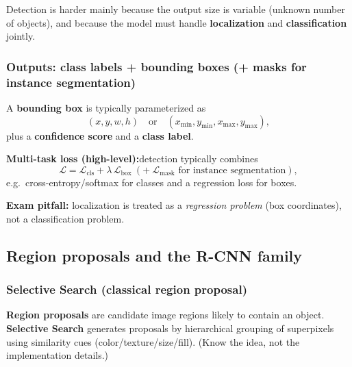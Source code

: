 \documentclass[11pt,a4paper]{article}
\begin{document}
\begin{notebox}
Detection is harder mainly because the output size is variable (unknown number of objects), and because the model must
handle \textbf{localization} and \textbf{classification} jointly.
\end{notebox}

\subsubsection{Outputs: class labels + bounding boxes (+ masks for instance segmentation)}

\begin{defbox}
A \textbf{bounding box} is typically parameterized as
\[
(x, y, w, h) \quad \text{or} \quad (x_{\min}, y_{\min}, x_{\max}, y_{\max}),
\]
plus a \textbf{confidence score} and a \textbf{class label}.
\end{defbox}

\begin{mathrule}
\textbf{Multi-task loss (high-level):}\quad detection typically combines
\[
\mathcal{L} = \mathcal{L}_{\text{cls}} + \lambda\,\mathcal{L}_{\text{box}} \ (+\ \mathcal{L}_{\text{mask}} \text{ for instance segmentation}),
\]
e.g.\ cross-entropy/softmax for classes and a regression loss for boxes.
\end{mathrule}

\begin{qbox}
\textbf{Exam pitfall:} localization is treated as a \emph{regression problem} (box coordinates), not a classification problem.
\end{qbox}

\subsection{Region proposals and the R-CNN family}

\subsubsection{Selective Search (classical region proposal)}

\begin{defbox}
\textbf{Region proposals} are candidate image regions likely to contain an object.
\textbf{Selective Search} generates proposals by hierarchical grouping of superpixels using similarity cues
(color/texture/size/fill). (Know the idea, not the implementation details.)
\end{defbox}
\end{document}
